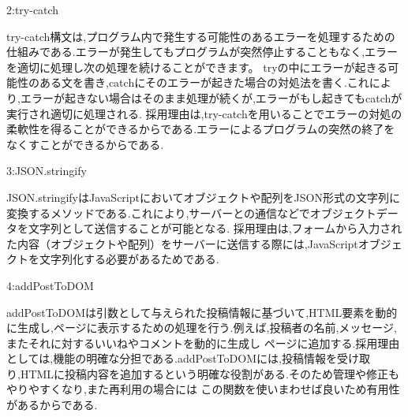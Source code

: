 \documentclass{jsarticle}
\begin{document}
2:try-catch \par
try-catch構文は,プログラム内で発生する可能性のあるエラーを処理するための仕組みである.エラーが発生してもプログラムが突然停止することもなく,エラーを適切に処理し次の処理を続けることができます。
tryの中にエラーが起きる可能性のある文を書き,catchにそのエラーが起きた場合の対処法を書く.これにより,エラーが起きない場合はそのまま処理が続くが,エラーがもし起きてもcatchが実行され適切に処理される.
採用理由は,try-catchを用いることでエラーの対処の柔軟性を得ることができるからである.エラーによるプログラムの突然の終了をなくすことができるからである.\par

3:JSON.stringify\par
JSON.stringifyはJavaScriptにおいてオブジェクトや配列をJSON形式の文字列に変換するメソッドである.これにより,サーバーとの通信などでオブジェクトデータを文字列として送信することが可能となる.
採用理由は,フォームから入力された内容（オブジェクトや配列）をサーバーに送信する際には,JavaScriptオブジェクトを文字列化する必要があるためである.


4:addPostToDOM\par
addPostToDOMは引数として与えられた投稿情報に基づいて,HTML要素を動的に生成し,ページに表示するための処理を行う.例えば,投稿者の名前,メッセージ,またそれに対するいいねやコメントを動的に生成し
ページに追加する.採用理由としては,機能の明確な分担である.addPostToDOMには,投稿情報を受け取り,HTMLに投稿内容を追加するという明確な役割がある.そのため管理や修正もやりやすくなり,また再利用の場合には
この関数を使いまわせば良いため有用性があるからである.
\end{document}
